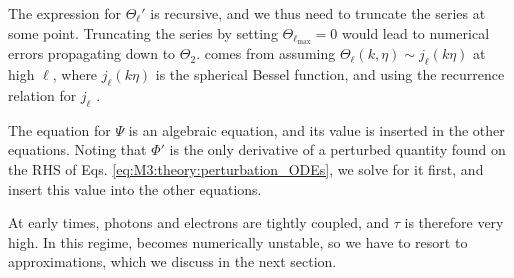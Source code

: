 The expression for $\Theta_\ell'$ is recursive, and we thus need to truncate the series at some point. Truncating the series by setting $\Theta_{\ell_\mathrm{max}}=0$ would lead to numerical errors propagating down to $\Theta_2$.  comes from assuming $\Theta_\ell(k,\eta)\sim j_\ell(k\eta)$ at high $\ell$, where $j_\ell(k\eta)$ is the spherical Bessel function, and using the recurrence relation for $j_\ell$ \citep[see][Eq. (46)-(49)]{callin}. 

The equation for $\Psi$ is an algebraic equation, and its value is inserted in the other equations. Noting that $\Phi'$ is the only derivative of a perturbed quantity found on the RHS of Eqs. \eqref{eq:M3:theory:perturbation_ODEs}, we solve for it first, and insert this value into the other equations. 

At early times, photons and electrons are tightly coupled, and $\tau$ is therefore very high. In this regime,  becomes numerically unstable, so we have to resort to approximations, which we discuss in the next section.   

